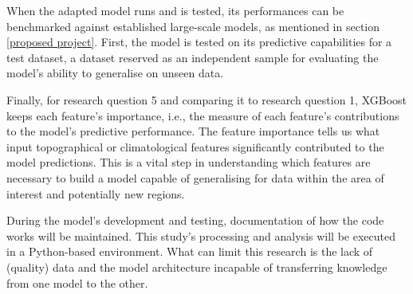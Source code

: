 When the adapted model runs and is tested, its performances can be benchmarked against established large-scale models, as mentioned in section \ref{proposed project}. First, the model is tested on its predictive capabilities for a test dataset, a dataset reserved as an independent sample for evaluating the model's ability to generalise on unseen data.

Finally, for research question 5 and comparing it to research question 1, XGBoost keeps each feature's importance, i.e., the measure of each feature's contributions to the model's predictive performance. The feature importance tells us what input topographical or climatological features significantly contributed to the model predictions. This is a vital step in understanding which features are necessary to build a model capable of generalising for data within the area of interest and potentially new regions. 

During the model's development and testing, documentation of how the code works will be maintained. This study's processing and analysis will be executed in a Python-based environment. What can limit this research is the lack of (quality) data and the model architecture incapable of transferring knowledge from one model to the other.
